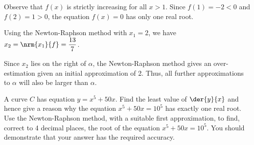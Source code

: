 \documentclass{jhwhw}
\begin{document}

        Observe that $f(x)$ is strictly increasing for all $x > 1$. Since $f(1) = -2 < 0$ and $f(2) = 1 > 0$, the equation $f(x) = 0$ has only one real root.

        Using the Newton-Raphson method with $x_1 = 2$, we have $x_2 = \nrm{x_1}{f} = \dfrac{13}7$.


        \begin{center}
        \end{center}

        Since $x_2$ lies on the right of $\alpha$, the Newton-Raphson method gives an over-estimation given an initial approximation of 2. Thus, all further approximations to $\alpha$ will also be larger than $\alpha$.

    \problem{}
        A curve $C$ has equation $y = x^5 + 50x$. Find the least value of $\der{y}{x}$ and hence give a reason why the equation $x^5+50x=10^5$ has exactly one real root. Use the Newton-Raphson method, with a suitable first approximation, to find, correct to 4 decimal places, the root of the equation $x^5+50x=10^5$. You should demonstrate that your answer has the required accuracy.
\end{document}
